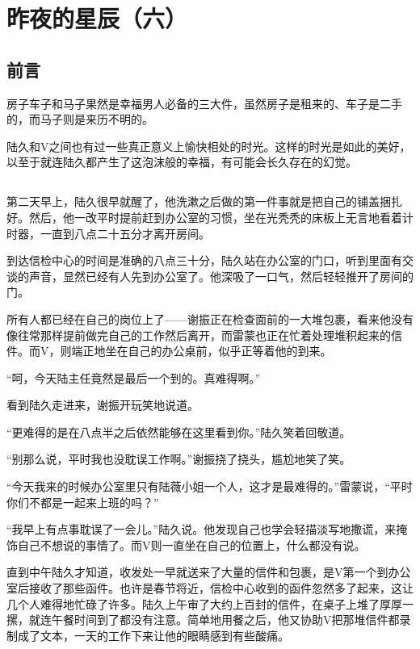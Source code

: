 \chapter{昨夜的星辰（六）}

\section*{前言}

房子车子和马子果然是幸福男人必备的三大件，虽然房子是租来的、车子是二手的，而马子则是来历不明的。

陆久和V之间也有过一些真正意义上愉快相处的时光。这样的时光是如此的美好，以至于就连陆久都产生了这泡沫般的幸福，有可能会长久存在的幻觉。

\lineseparator
\section*{}

第二天早上，陆久很早就醒了，他洗漱之后做的第一件事就是把自己的铺盖捆扎好。然后，他一改平时提前赶到办公室的习惯，坐在光秃秃的床板上无言地看着计时器，一直到八点二十五分才离开房间。

到达信检中心的时间是准确的八点三十分，陆久站在办公室的门口，听到里面有交谈的声音，显然已经有人先到办公室了。他深吸了一口气，然后轻轻推开了房间的门。

所有人都已经在自己的岗位上了——谢振正在检查面前的一大堆包裹，看来他没有像往常那样提前做完自己的工作然后离开，而雷蒙也正在忙着处理堆积起来的信件。而V，则端正地坐在自己的办公桌前，似乎正等着他的到来。

“呵，今天陆主任竟然是最后一个到的。真难得啊。”

看到陆久走进来，谢振开玩笑地说道。

“更难得的是在八点半之后依然能够在这里看到你。”陆久笑着回敬道。

“别那么说，平时我也没耽误工作啊。”谢振挠了挠头，尴尬地笑了笑。

“今天我来的时候办公室里只有陆薇小姐一个人，这才是最难得的。”雷蒙说，“平时你们不都是一起来上班的吗？”

“我早上有点事耽误了一会儿。”陆久说。他发现自己也学会轻描淡写地撒谎，来掩饰自己不想说的事情了。而V则一直坐在自己的位置上，什么都没有说。

直到中午陆久才知道，收发处一早就送来了大量的信件和包裹，是V第一个到办公室后接收了那些函件。也许是春节将近，信检中心收到的函件忽然多了起来，这让几个人难得地忙碌了许多。陆久上午审了大约上百封的信件，在桌子上堆了厚厚一摞，就连午餐时间到了都没有注意。简单地用餐之后，他又协助V把那堆信件都录制成了文本，一天的工作下来让他的眼睛感到有些酸痛。

